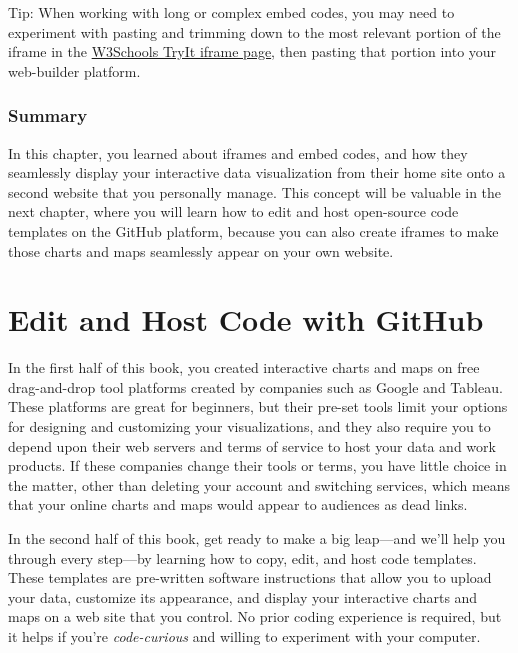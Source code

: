 \documentclass[
  english,
]{book}
\begin{document}
Tip: When working with long or complex embed codes, you may need to experiment with pasting and trimming down to the most relevant portion of the iframe in the \href{https://www.w3schools.com/tags/tryit.asp?filename=tryhtml_iframe}{W3Schools TryIt iframe page}, then pasting that portion into your web-builder platform.

\hypertarget{summary9}{%
\subsection*{Summary}\label{summary9}}

In this chapter, you learned about iframes and embed codes, and how they seamlessly display your interactive data visualization from their home site onto a second website that you personally manage. This concept will be valuable in the next chapter, where you will learn how to edit and host open-source code templates on the GitHub platform, because you can also create iframes to make those charts and maps seamlessly appear on your own website.

\hypertarget{github}{%
\chapter{Edit and Host Code with GitHub}\label{github}}

In the first half of this book, you created interactive charts and maps on free drag-and-drop tool platforms created by companies such as Google and Tableau. These platforms are great for beginners, but their pre-set tools limit your options for designing and customizing your visualizations, and they also require you to depend upon their web servers and terms of service to host your data and work products. If these companies change their tools or terms, you have little choice in the matter, other than deleting your account and switching services, which means that your online charts and maps would appear to audiences as dead links.

In the second half of this book, get ready to make a big leap---and we'll help you through every step---by learning how to copy, edit, and host code templates. These templates are pre-written software instructions that allow you to upload your data, customize its appearance, and display your interactive charts and maps on a web site that you control. No prior coding experience is required, but it helps if you're \emph{code-curious} and willing to experiment with your computer.
\end{document}
